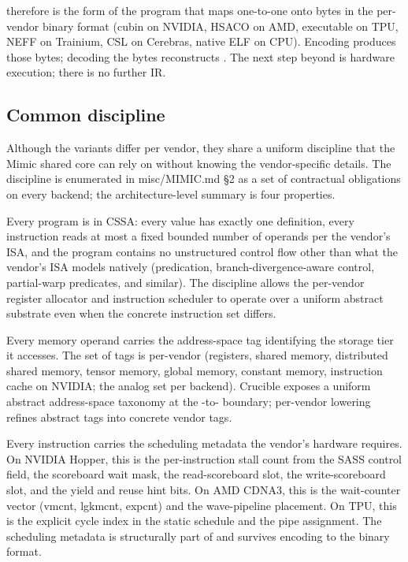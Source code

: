 therefore is the form of the program that maps one-to-one onto bytes in the per-vendor binary format (cubin on NVIDIA, HSACO on AMD, executable on TPU, NEFF on Trainium, CSL on Cerebras, native ELF on CPU).
Encoding  produces those bytes; decoding the bytes reconstructs .
The next step beyond  is hardware execution; there is no further IR.

\subsection{Common discipline}
\label{sec:ir003-common}

Although the variants differ per vendor, they share a uniform discipline that the Mimic shared core can rely on without knowing the vendor-specific details.
The discipline is enumerated in misc/MIMIC.md \S2 as a set of contractual obligations on every backend; the architecture-level summary is four properties.

\begin{property}
\label{prop:ir003-cssa}
Every  program is in CSSA: every value has exactly one definition, every instruction reads at most a fixed bounded number of operands per the vendor's ISA, and the program contains no unstructured control flow other than what the vendor's ISA models natively (predication, branch-divergence-aware control, partial-warp predicates, and similar).
The discipline allows the per-vendor register allocator and instruction scheduler to operate over a uniform abstract substrate even when the concrete instruction set differs.
\end{property}

\begin{property}
\label{prop:ir003-as-tags}
Every memory operand carries the address-space tag identifying the storage tier it accesses.
The set of tags is per-vendor (registers, shared memory, distributed shared memory, tensor memory, global memory, constant memory, instruction cache on NVIDIA; the analog set per backend).
Crucible exposes a uniform abstract address-space taxonomy at the -to- boundary; per-vendor lowering refines abstract tags into concrete vendor tags.
\end{property}

\begin{property}
\label{prop:ir003-sched}
Every instruction carries the scheduling metadata the vendor's hardware requires.
On NVIDIA Hopper, this is the per-instruction stall count from the SASS control field, the scoreboard wait mask, the read-scoreboard slot, the write-scoreboard slot, and the yield and reuse hint bits.
On AMD CDNA3, this is the wait-counter vector (vmcnt, lgkmcnt, expcnt) and the wave-pipeline placement.
On TPU, this is the explicit cycle index in the static schedule and the pipe assignment.
The scheduling metadata is structurally part of  and survives encoding to the binary format.
\end{property}

